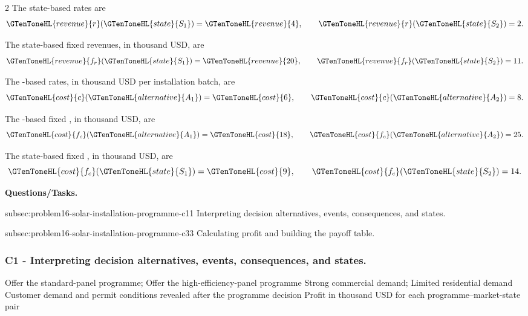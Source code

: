 \begin{multicols}{2}
	The state-based  rates are
	\[
	\GTenToneHL{revenue}{r}(\GTenToneHL{state}{S_1})=\GTenToneHL{revenue}{4},
	\qquad
	\GTenToneHL{revenue}{r}(\GTenToneHL{state}{S_2})=2.
	\]
	
	The state-based fixed revenues, in thousand USD, are
	\[
	\GTenToneHL{revenue}{f_r}(\GTenToneHL{state}{S_1})=\GTenToneHL{revenue}{20},
	\qquad
	\GTenToneHL{revenue}{f_r}(\GTenToneHL{state}{S_2})=11.
	\]
	
	The -based  rates, in thousand USD per installation
	batch, are
	\[
	\GTenToneHL{cost}{c}(\GTenToneHL{alternative}{A_1})=\GTenToneHL{cost}{6},
	\qquad
	\GTenToneHL{cost}{c}(\GTenToneHL{alternative}{A_2})=8.
	\]
	
	The -based fixed , in thousand USD, are
	\[
	\GTenToneHL{cost}{f_c}(\GTenToneHL{alternative}{A_1})=\GTenToneHL{cost}{18},
	\qquad
	\GTenToneHL{cost}{f_c}(\GTenToneHL{alternative}{A_2})=25.
	\]
	
	The state-based fixed , in thousand USD, are
	\[
	\GTenToneHL{cost}{f_c}(\GTenToneHL{state}{S_1})=\GTenToneHL{cost}{9},
	\qquad
	\GTenToneHL{cost}{f_c}(\GTenToneHL{state}{S_2})=14.
	\]
\end{multicols}

\textbf{Questions/Tasks.}
\begin{enumerate}
	\CriterionTask
	{subsec:problem16-solar-installation-programme-c1}{1}
	{Interpreting decision alternatives, events, consequences, and states.}

	\CriterionTask
	{subsec:problem16-solar-installation-programme-c3}{3}
	{Calculating profit and building the payoff table.}
\end{enumerate}

\subsubsection*{C1 - Interpreting decision alternatives, events, consequences, and states.}
\label{subsec:problem16-solar-installation-programme-c1}

\DecisionElementsTable
{Offer the standard-panel programme; Offer the high-efficiency-panel programme}
{Strong commercial demand; Limited residential demand}
{Customer demand and permit conditions revealed after the programme decision}
{Profit in thousand USD for each programme--market-state pair}

